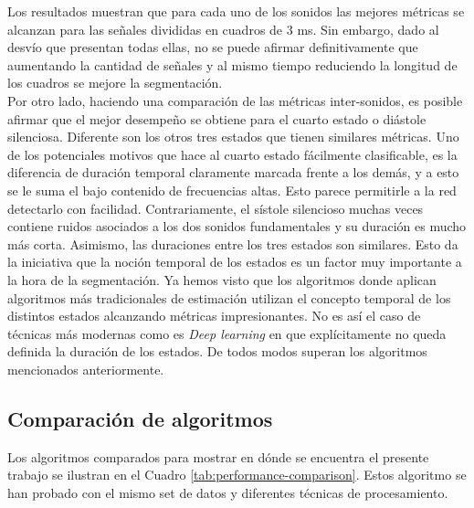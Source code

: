 \indent Los resultados muestran que para cada uno de los sonidos las mejores métricas se alcanzan para las señales
divididas en cuadros de 3 ms. Sin embargo, dado al desvío que presentan todas ellas, no se puede afirmar
definitivamente que aumentando la cantidad de señales y al mismo tiempo reduciendo la longitud de los cuadros se
mejore la segmentación. \\
\indent Por otro lado, haciendo una comparación de las métricas inter-sonidos, es posible afirmar que el mejor
desempeño se obtiene para el cuarto estado o diástole silenciosa. Diferente son los otros tres estados que tienen
similares métricas. Uno de los potenciales motivos que hace al cuarto estado fácilmente clasificable, es la
diferencia de duración temporal claramente marcada frente a los demás, y a esto se le suma el bajo contenido de
frecuencias altas. Esto parece permitirle a la red detectarlo con facilidad. Contrariamente, el sístole silencioso
muchas veces contiene ruidos asociados a los dos sonidos fundamentales y su duración es mucho más corta. Asimismo,
las duraciones entre los tres estados son similares.
Esto da la iniciativa que la noción temporal de los estados es un factor muy importante a la hora de la segmentación.
Ya hemos visto que los algoritmos \cite{pp:schmidt2010,pp:springer2015} donde aplican algoritmos más tradicionales de estimación utilizan el concepto temporal de los distintos estados alcanzando métricas impresionantes. No es así el caso de técnicas más modernas como es
\textit{Deep learning} en \cite{pp:renna2018} que explícitamente no queda definida la duración de los estados.
De todos modos superan los algoritmos mencionados anteriormente.

\subsection*{Comparación de algoritmos}

\indent Los algoritmos comparados para mostrar en dónde se encuentra el presente trabajo se ilustran en el Cuadro
\ref{tab:performance-comparison}.
Estos algoritmo se han probado con el mismo set de datos y diferentes técnicas de procesamiento.

